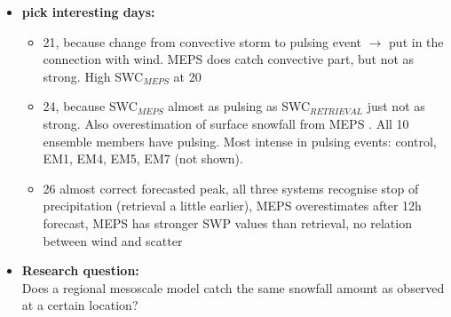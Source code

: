 \begin{itemize}
	\item \textbf{pick interesting days:}
	\begin{itemize}
		\item \SI{21}{\dec}, because change from convective storm to pulsing event $\rightarrow$ put in the connection with wind. MEPS does catch convective part, but not as strong. High SWC$_\textit{MEPS}$ at \SI{20}{\UTC}
		\item \SI{24}{\dec}, because SWC$_\mathit{MEPS}$ almost as pulsing as SWC$_\mathit{RETRIEVAL}$ just not as strong. Also overestimation of surface snowfall from MEPS . All 10 ensemble members have pulsing. Most intense in pulsing events: control, EM1, EM4, EM5, EM7 (not shown).
		\item \SI{26}{\dec} almost correct forecasted peak, all three systems recognise stop of precipitation (retrieval a little earlier), MEPS overestimates after 12h forecast, MEPS has stronger SWP values than retrieval, no relation between wind and scatter
	\end{itemize}
	\item \textbf{Research question:}  \\ Does a regional mesoscale model catch the same snowfall amount as observed at a certain location?
\end{itemize}



